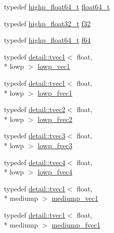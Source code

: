 \begin{DoxyCompactItemize}
\item 
typedef \hyperlink{group__gtc__type__precision_gae8b3b2ace5be2a61c6bf63f12643fa15}{highp\-\_\-float64\-\_\-t} \hyperlink{group__gtc__type__precision_gade966a3eb25ebeb16dd53c40d3fdeb46}{float64\-\_\-t}
\item 
typedef \hyperlink{group__gtc__type__precision_ga4e16a7818d09e2da3b81765999f23928}{highp\-\_\-float32\-\_\-t} \hyperlink{group__gtc__type__precision_ga0ec999b57f5330d9021256e96038df04}{f32}
\item 
typedef \hyperlink{group__gtc__type__precision_gae8b3b2ace5be2a61c6bf63f12643fa15}{highp\-\_\-float64\-\_\-t} \hyperlink{group__gtc__type__precision_ga2bba392e555124b36cde6abba349bab3}{f64}
\item 
typedef \hyperlink{structglm_1_1detail_1_1tvec1}{detail\-::tvec1}$<$ float, \\*
lowp $>$ \hyperlink{group__gtc__type__precision_gae48c64f920be353ece773ff367f0161c}{lowp\-\_\-vec1}
\item 
typedef \hyperlink{structglm_1_1detail_1_1tvec1}{detail\-::tvec1}$<$ float, \\*
lowp $>$ \hyperlink{group__gtc__type__precision_gad5266f0507395cf8cdfe84b9cf5496e4}{lowp\-\_\-fvec1}
\item 
typedef \hyperlink{structglm_1_1detail_1_1tvec2}{detail\-::tvec2}$<$ float, \\*
lowp $>$ \hyperlink{group__gtc__type__precision_gaf365442c52322b810bc0ed943e539229}{lowp\-\_\-fvec2}
\item 
typedef \hyperlink{structglm_1_1detail_1_1tvec3}{detail\-::tvec3}$<$ float, \\*
lowp $>$ \hyperlink{group__gtc__type__precision_ga83d77dfe136d4add9e214cd205320c12}{lowp\-\_\-fvec3}
\item 
typedef \hyperlink{structglm_1_1detail_1_1tvec4}{detail\-::tvec4}$<$ float, \\*
lowp $>$ \hyperlink{group__gtc__type__precision_ga0d016cdbff067c450122115d0620bf85}{lowp\-\_\-fvec4}
\item 
typedef \hyperlink{structglm_1_1detail_1_1tvec1}{detail\-::tvec1}$<$ float, \\*
mediump $>$ \hyperlink{group__gtc__type__precision_ga1b734d715033ab3026b2fb27e1fb7d3e}{mediump\-\_\-vec1}
\item 
typedef \hyperlink{structglm_1_1detail_1_1tvec1}{detail\-::tvec1}$<$ float, \\*
mediump $>$ \hyperlink{group__gtc__type__precision_ga4534af301d5260974cee29f76842d579}{mediump\-\_\-fvec1}

\end{DoxyCompactItemize}
